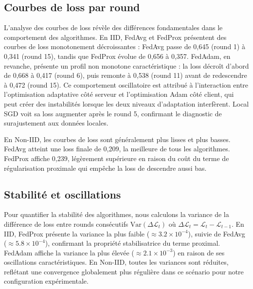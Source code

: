 \documentclass[12pt,a4paper]{report}
\begin{document}
\subsection{Courbes de loss par round}

L'analyse des courbes de loss r\'{e}v\`{e}le des diff\'{e}rences fondamentales dans le comportement des algorithmes. En IID, FedAvg et FedProx pr\'{e}sentent des courbes de loss monotonement d\'{e}croissantes : FedAvg passe de 0,645 (round 1) \`{a} 0,341 (round 15), tandis que FedProx \'{e}volue de 0,656 \`{a} 0,357. FedAdam, en revanche, pr\'{e}sente un profil non monotone caract\'{e}ristique : la loss d\'{e}cro\^{i}t d'abord de 0,668 \`{a} 0,417 (round 6), puis remonte \`{a} 0,538 (round 11) avant de redescendre \`{a} 0,472 (round 15). Ce comportement oscillatoire est attribu\'{e} \`{a} l'interaction entre l'optimisation adaptative c\^{o}t\'{e} serveur et l'optimisation Adam c\^{o}t\'{e} client, qui peut cr\'{e}er des instabilit\'{e}s lorsque les deux niveaux d'adaptation interfèrent. Local SGD voit sa loss augmenter apr\`{e}s le round 5, confirmant le diagnostic de surajustement aux donn\'{e}es locales.

En Non-IID, les courbes de loss sont g\'{e}n\'{e}ralement plus lisses et plus basses. FedAvg atteint une loss finale de 0,209, la meilleure de tous les algorithmes. FedProx affiche 0,239, l\'{e}g\`{e}rement sup\'{e}rieure en raison du co\^{u}t du terme de r\'{e}gularisation proximale qui emp\^{e}che la loss de descendre aussi bas.

\subsection{Stabilit\'{e} et oscillations}

Pour quantifier la stabilit\'{e} des algorithmes, nous calculons la variance de la diff\'{e}rence de loss entre rounds cons\'{e}cutifs $\text{Var}(\Delta \mathcal{L}_t)$ o\`{u} $\Delta \mathcal{L}_t = \mathcal{L}_{t} - \mathcal{L}_{t-1}$. En IID, FedProx pr\'{e}sente la variance la plus faible ($\approx 3.2 \times 10^{-4}$), suivie de FedAvg ($\approx 5.8 \times 10^{-4}$), confirmant la propri\'{e}t\'{e} stabilisatrice du terme proximal. FedAdam affiche la variance la plus \'{e}lev\'{e}e ($\approx 2.1 \times 10^{-3}$) en raison de ses oscillations caract\'{e}ristiques. En Non-IID, toutes les variances sont r\'{e}duites, refl\'{e}tant une convergence globalement plus r\'{e}guli\`{e}re dans ce sc\'{e}nario pour notre configuration exp\'{e}rimentale.
\end{document}
